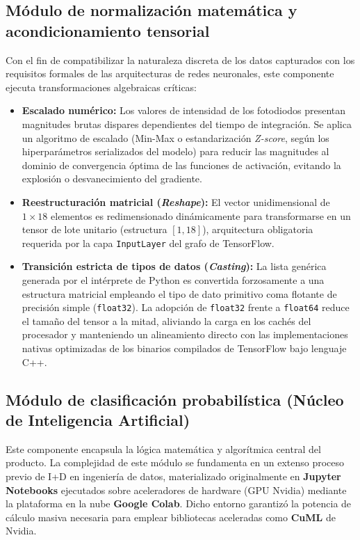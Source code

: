\subsection*{Módulo de normalización matemática y acondicionamiento tensorial}

Con el fin de compatibilizar la naturaleza discreta de los datos capturados con los requisitos formales de las arquitecturas de redes neuronales, este componente ejecuta transformaciones algebraicas críticas:

\begin{itemize}
    \item \textbf{Escalado numérico:} Los valores de intensidad de los fotodiodos presentan magnitudes brutas dispares dependientes del tiempo de integración. Se aplica un algoritmo de escalado (Min-Max o estandarización \textit{Z-score}\cite{hastie2009elements}, según los hiperparámetros serializados del modelo) para reducir las magnitudes al dominio de convergencia óptima de las funciones de activación, evitando la explosión o desvanecimiento del gradiente\cite{bengio2013difficulty}.
    \item \textbf{Reestructuración matricial (\textit{Reshape}):} El vector unidimensional de $1\times18$ elementos es redimensionado dinámicamente para transformarse en un tensor de lote unitario (estructura $[1, 18]$), arquitectura obligatoria requerida por la capa \texttt{InputLayer} del grafo de TensorFlow.
    \item \textbf{Transición estricta de tipos de datos (\textit{Casting}):} La lista genérica generada por el intérprete de Python es convertida forzosamente a una estructura matricial empleando el tipo de dato primitivo coma flotante de precisión simple (\texttt{float32}). La adopción de \texttt{float32} frente a \texttt{float64} reduce el tamaño del tensor a la mitad, aliviando la carga en los cachés del procesador y manteniendo un alineamiento directo con las implementaciones nativas optimizadas de los binarios compilados de TensorFlow bajo lenguaje C++.
\end{itemize}

\subsection*{Módulo de clasificación probabilística (Núcleo de Inteligencia Artificial)}

Este componente encapsula la lógica matemática y algorítmica central del producto. La complejidad de este módulo se fundamenta en un extenso proceso previo de I+D en ingeniería de datos, materializado originalmente en \textbf{Jupyter Notebooks} ejecutados sobre aceleradores de hardware (GPU Nvidia) mediante la plataforma en la nube \textbf{Google Colab}. Dicho entorno garantizó la potencia de cálculo masiva necesaria para emplear bibliotecas aceleradas como \textbf{CuML} de Nvidia.

